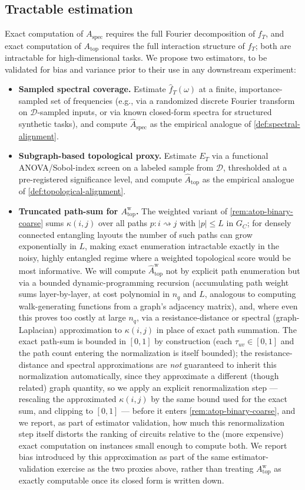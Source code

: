 \documentclass[11pt]{article}
\newcommand{\Aspec}{A_{\mathrm{spec}}}
\newcommand{\Atop}{A_{\mathrm{top}}}
\newcommand{\fT}{f_T}
\begin{document}
\subsection{Tractable estimation}
\label{sec:estimation}
Exact computation of $\Aspec$ requires the full Fourier decomposition of $\fT$, and exact computation of $\Atop$ requires the full interaction structure of $\fT$; both are intractable for high-dimensional tasks. We propose two estimators, to be validated for bias and variance prior to their use in any downstream experiment:
\begin{itemize}[leftmargin=1.6em]
    \item \textbf{Sampled spectral coverage.} Estimate $\hat\fT(\omega)$ at a finite, importance-sampled set of frequencies (e.g., via a randomized discrete Fourier transform on $\mathcal{D}$-sampled inputs, or via known closed-form spectra for structured synthetic tasks), and compute $\hat\Aspec$ as the empirical analogue of \cref{def:spectral-alignment}.
    \item \textbf{Subgraph-based topological proxy.} Estimate $E_T$ via a functional ANOVA/Sobol-index screen on a labeled sample from $\mathcal{D}$, thresholded at a pre-registered significance level, and compute $\hat\Atop$ as the empirical analogue of \cref{def:topological-alignment}.
    \item \textbf{Truncated path-sum for $\Atop^{\mathrm{w}}$.} The weighted variant of \cref{rem:atop-binary-coarse} sums $\kappa(i,j)$ over all paths $p:i\rightsquigarrow j$ with $|p|\le L$ in $G_C$; for densely connected entangling layouts the number of such paths can grow exponentially in $L$, making exact enumeration intractable exactly in the noisy, highly entangled regime where a weighted topological score would be most informative. We will compute $\hat\Atop^{\mathrm{w}}$ not by explicit path enumeration but via a bounded dynamic-programming recursion (accumulating path weight sums layer-by-layer, at cost polynomial in $n_q$ and $L$, analogous to computing walk-generating functions from a graph's adjacency matrix), and, where even this proves too costly at large $n_q$, via a resistance-distance or spectral (graph-Laplacian) approximation to $\kappa(i,j)$ in place of exact path summation. The exact path-sum is bounded in $[0,1]$ by construction (each $\tau_{uv}\in[0,1]$ and the path count entering the normalization is itself bounded); the resistance-distance and spectral approximations are \emph{not} guaranteed to inherit this normalization automatically, since they approximate a different (though related) graph quantity, so we apply an explicit renormalization step --- rescaling the approximated $\kappa(i,j)$ by the same bound used for the exact sum, and clipping to $[0,1]$ --- before it enters \cref{rem:atop-binary-coarse}, and we report, as part of estimator validation, how much this renormalization step itself distorts the ranking of circuits relative to the (more expensive) exact computation on instances small enough to compute both. We report bias introduced by this approximation as part of the same estimator-validation exercise as the two proxies above, rather than treating $\Atop^{\mathrm{w}}$ as exactly computable once its closed form is written down.
\end{itemize}
\end{document}
